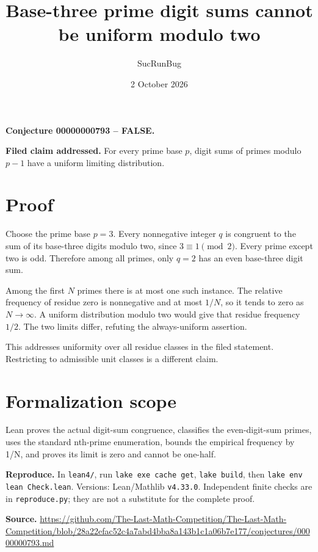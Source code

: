\documentclass[11pt]{article}
\title{Base-three prime digit sums cannot be uniform modulo two}
\author{SucRunBug}
\date{2 October 2026}
\begin{document}
\maketitle
\textbf{Conjecture 00000000793 -- FALSE.}

\textbf{Filed claim addressed.} For every prime base $p$, digit sums of primes modulo $p-1$ have a uniform limiting distribution.

\section*{Proof}
Choose the prime base $p=3$. Every nonnegative integer $q$ is congruent to the sum of its base-three digits modulo two, since $3\equiv1\pmod2$. Every prime except two is odd. Therefore among all primes, only $q=2$ has an even base-three digit sum.

Among the first $N$ primes there is at most one such instance. The relative frequency of residue zero is nonnegative and at most $1/N$, so it tends to zero as $N\to\infty$. A uniform distribution modulo two would give that residue frequency $1/2$. The two limits differ, refuting the always-uniform assertion.

This addresses uniformity over all residue classes in the filed statement. Restricting to admissible unit classes is a different claim.

\section*{Formalization scope}
Lean proves the actual digit-sum congruence, classifies the even-digit-sum primes, uses the standard nth-prime enumeration, bounds the empirical frequency by 1/N, and proves its limit is zero and cannot be one-half.

\textbf{Reproduce.} In \texttt{lean4/}, run \texttt{lake exe cache get},
\texttt{lake build}, then \texttt{lake env lean Check.lean}. Versions:
Lean/Mathlib \texttt{v4.33.0}. Independent finite checks are in
\texttt{reproduce.py}; they are not a substitute for the complete proof.

\textbf{Source.} \url{https://github.com/The-Last-Math-Competition/The-Last-Math-Competition/blob/28a22efac52c4a7abd4bba8a143b1c1a06b7e177/conjectures/00000000793.md}
\end{document}
